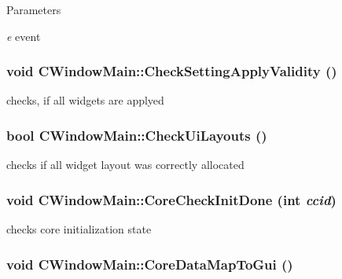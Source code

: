 \begin{DoxyParams}{Parameters}
\item[{\em e}]event \end{DoxyParams}
\hypertarget{classCWindowMain_af1f48b80b58de4cefaee7ca9fdfaa912}{
\subsubsection[{CheckSettingApplyValidity}]{\setlength{\rightskip}{0pt plus 5cm}void CWindowMain::CheckSettingApplyValidity ()}}
\label{classCWindowMain_af1f48b80b58de4cefaee7ca9fdfaa912}
checks, if all widgets are applyed \hypertarget{classCWindowMain_a0c10998825e8d84929d0926b6db8ca23}{
\subsubsection[{CheckUiLayouts}]{\setlength{\rightskip}{0pt plus 5cm}bool CWindowMain::CheckUiLayouts ()}}
\label{classCWindowMain_a0c10998825e8d84929d0926b6db8ca23}
checks if all widget layout was correctly allocated \hypertarget{classCWindowMain_a64befadac7e02a2a690e89706badd766}{
\subsubsection[{CoreCheckInitDone}]{\setlength{\rightskip}{0pt plus 5cm}void CWindowMain::CoreCheckInitDone (int {\em ccid})}}
\label{classCWindowMain_a64befadac7e02a2a690e89706badd766}
checks core initialization state \hypertarget{classCWindowMain_a98613fbc73c34cbafce2990aa4585e0f}{
\subsubsection[{CoreDataMapToGui}]{\setlength{\rightskip}{0pt plus 5cm}void CWindowMain::CoreDataMapToGui ()}}
